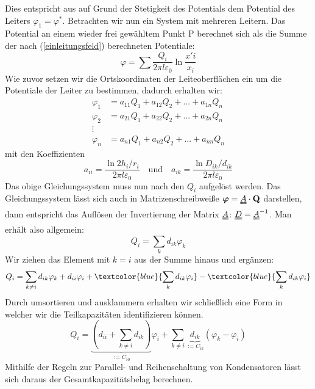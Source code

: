 Dies entspricht aus auf Grund der Stetigkeit des Potentials %
dem Potential des Leiters $\varphi_1 = \varphi^*$.
Betrachten wir nun ein System mit mehreren Leitern. Das Potential an einem wieder frei gewähltem Punkt P berechnet sich als die Summe der nach (\ref{einleitungsfeld}) berechneten Potentiale:
\begin{equation}
\varphi = \sum \frac{Q_i}{2\pi l\varepsilon_0} \ln \frac{x'i}{x_i}
\end{equation}
Wie zuvor setzen wir die Ortskoordinaten der Leiteoberflächen ein um die Potentiale der Leiter zu bestimmen, dadurch erhalten wir:
\begin{align}
\varphi_1 &= a_{11} Q_1 + a_{12} Q_{2} + ... + a_{1n} Q_n \\
\varphi_2 &= a_{21} Q_1 + a_{22} Q_{2} + ... + a_{2n} Q_n \\
\vdots \\
\varphi_n &= a_{n1} Q_1 + a_{n2} Q_{2} + ... + a_{nn} Q_n
\end{align}
mit den Koeffizienten
\begin{equation}
a_{ii} = \frac{\ln 2h_i/r_i}{2\pi l \varepsilon_0} \quad \textrm{und} \quad a_{ik} = \frac{\ln D_{ik}/d_{ik}}{2\pi l \varepsilon_0}
\end{equation}
Das obige Gleichungssystem muss nun nach den $Q_i$ aufgelöst werden. Das Gleichungssystem lässt sich auch in Matrizenschreibweiße $\boldsymbol{\varphi} = \uuline{A} \cdot \mathbf{Q}$ darstellen, dann entspricht das Auflösen der Invertierung der Matrix $\uuline{A}$: $\uuline{D}=\uuline{A}^{-1}$. Man erhält also allgemein:
\begin{equation}
Q_i = \sum_k d_{ik}\varphi_k
\end{equation}
Wir ziehen das Element mit $k=i$ aus der Summe hinaus und ergänzen:
\begin{equation}
Q_i = \sum_{k\neq i} d_{ik}\varphi_k + d_{ii}\varphi_i + \textcolor{blue}{\sum_k d_{ik}\varphi_i} - \textcolor{blue}
{\sum_k d_{ik}\varphi_i}
\end{equation}
Durch umsortieren und ausklammern erhalten wir schließlich eine Form in welcher wir die Teilkapazitäten identifizieren können.
\begin{equation}
Q_i = \underbrace{\left(d_{ii}+\sum_{k\neq i}d_{ik}\right)}_{:=C_{i0}}\varphi_i + \sum_{k\neq i} \underbrace{d_{ik}}_{:=C_{ik}} \left( \varphi_k - \varphi_i \right)
\end{equation}
Mithilfe der Regeln zur Parallel- und Reihenschaltung von Kondensatoren lässt sich daraus der Gesamtkapazitätsbelag berechnen.
